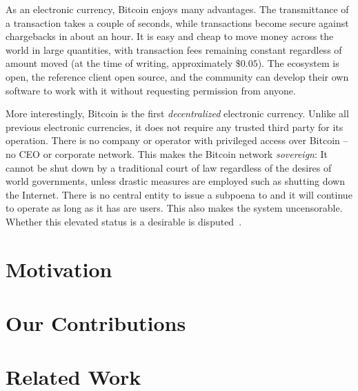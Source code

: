 As an electronic currency, Bitcoin enjoys many advantages. The transmittance of
a transaction takes a couple of seconds, while transactions become secure
against chargebacks in about an hour. It is easy and cheap to move money across
the world in large quantities, with transaction fees remaining constant
regardless of amount moved (at the time of writing, approximately $\$0.05$). The
ecosystem is open, the reference client open source, and the community can
develop their own software to work with it without requesting permission from
anyone.

More interestingly, Bitcoin is the first \emph{decentralized} electronic
currency. Unlike all previous electronic currencies, it does not require any
trusted third party for its operation. There is no company or operator with
privileged access over Bitcoin -- no CEO or corporate network. This makes
the Bitcoin network \emph{sovereign}: It cannot be shut down by a traditional
court of law regardless of the desires of world governments, unless drastic
measures are employed such as shutting down the Internet. There is no central
entity to issue a subpoena to and it will continue to operate as long as it has
are users. This also makes the system uncensorable. Whether this elevated status
is a desirable is disputed~\cite{egalitarianism}.


\section{Motivation}
\section{Our Contributions}
\section{Related Work}
